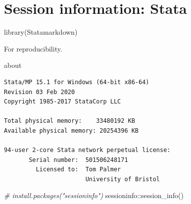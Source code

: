 \documentclass[
  10pt,
]{book}
\newenvironment{Shaded}{\begin{snugshade}}{\end{snugshade}}
\newcommand{\CommentTok}[1]{\textcolor[rgb]{0.56,0.35,0.01}{\textit{#1}}}
\newcommand{\FunctionTok}[1]{\textcolor[rgb]{0.00,0.00,0.00}{#1}}
\newcommand{\NormalTok}[1]{#1}
\newcommand{\SpecialCharTok}[1]{\textcolor[rgb]{0.00,0.00,0.00}{#1}}
\begin{document}
\hypertarget{session-information-stata}{%
\chapter*{Session information: Stata}\label{session-information-stata}}

\begin{Shaded}
\begin{Highlighting}[]
\FunctionTok{library}\NormalTok{(Statamarkdown)}
\end{Highlighting}
\end{Shaded}

For reproducibility.

\begin{Shaded}
\begin{Highlighting}[]
\NormalTok{about}
\end{Highlighting}
\end{Shaded}

\begin{verbatim}
Stata/MP 15.1 for Windows (64-bit x86-64)
Revision 03 Feb 2020
Copyright 1985-2017 StataCorp LLC

Total physical memory:    33480192 KB
Available physical memory: 20254396 KB

94-user 2-core Stata network perpetual license:
       Serial number:  501506248171
         Licensed to:  Tom Palmer
                       University of Bristol
\end{verbatim}

\begin{Shaded}
\begin{Highlighting}[]
\CommentTok{\# install.packages("sessioninfo")}
\NormalTok{sessioninfo}\SpecialCharTok{::}\FunctionTok{session\_info}\NormalTok{()}
\end{Highlighting}
\end{Shaded}
\end{document}
